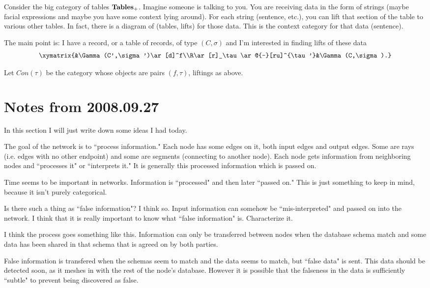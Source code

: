 \documentclass{amsart}
\def\Tables{{\bf Tables}}
\begin{document}
Consider the big category of tables $\Tables_+$.  Imagine someone is talking to you.  You are receiving data in the form of strings (maybe facial expressions and maybe you have some context lying around). For each string (sentence, etc.), you can lift that section of the table to various other tables.  In fact, there is a diagram of (tables, lifts) for those data.  This is the context category for that data (sentence).

The main point is: I have a record, or a table of records, of type $(C,\sigma)$ and I'm interested in finding lifts of these data $$\xymatrix{&\Gamma(C',\sigma')\ar[d]^f\\R\ar[r]_\tau\ar@{--}[ru]^{\tau'}&\Gamma(C,\sigma).}$$

Let $Con(\tau)$ be the category whose objects are pairs $(f,\tau)$, liftings as above.

\section{Notes from 2008.09.27}

In this section I will just write down some ideas I had today.

The goal of the network is to ``process information."  Each node has some edges on it, both input edges and output edges.  Some are rays (i.e. edges with no other endpoint) and some are segments (connecting to another node).  Each node gets information from neighboring nodes and ``processes it" or ``interprets it."  It is generally this processed information which is passed on.

Time seems to be important in networks.  Information is ``processed" and then later ``passed on."  This is just something to keep in mind, because it isn't purely categorical.

Is there such a thing as ``false information"?  I think so.  Input information can somehow be ``mis-interpreted" and passed on into the network.  I think that it is really important to know what ``false information" is.  Characterize it.

I think the process goes something like this.  Information can only be transferred between nodes when the database schema match and some data has been shared in that schema that is agreed on by both parties.

False information is transfered when the schemas seem to match and the data seems to match, but ``false data" is sent.  This data should be detected soon, as it meshes in with the rest of the node's database.  However it is possible that the falseness in the data is sufficiently ``subtle" to prevent being discovered as false.
\end{document}
